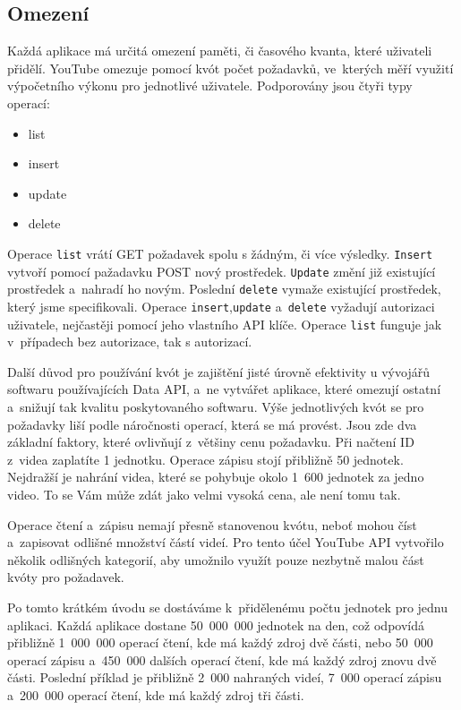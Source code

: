 \subsection{Omezení}
\par Každá aplikace má určitá omezení\cite{googleconsole} paměti\cite{quota}, či časového kvanta, které uživateli přidělí. YouTube omezuje pomocí kvót počet požadavků, ve~kterých měří využití výpočetního výkonu pro jednotlivé uživatele. Podporovány jsou čtyři typy operací:
\begin{itemize}
\item {list}
\item {insert}
\item {update}
\item {delete}
\end{itemize}
\par Operace \texttt{list} vrátí GET požadavek spolu s žádným, či více výsledky. \texttt{Insert} vytvoří pomocí pažadavku POST nový prostředek. \texttt{Update} změní již existující prostředek a~nahradí ho novým. Poslední \texttt{delete} vymaže existující prostředek, který jsme specifikovali. Operace \texttt{insert},\texttt{update} a~\texttt{delete} vyžadují autorizaci uživatele, nejčastěji pomocí jeho vlastního API\cite{apistart} klíče. Operace \texttt{list} funguje jak v~případech bez autorizace, tak s autorizací.
\par Další důvod pro používání kvót je zajištění jisté úrovně efektivity u vývojářů softwaru používajících Data API, a~ne vytvářet aplikace, které omezují ostatní a~snižují tak kvalitu poskytovaného softwaru. Výše jednotlivých kvót se pro požadavky liší podle náročnosti operací, která se má provést. Jsou zde dva základní faktory, které ovlivňují z~většiny cenu požadavku. Při načtení ID z~videa zaplatíte 1 jednotku. Operace zápisu stojí přibližně 50 jednotek. Nejdražší je nahrání videa, které se pohybuje okolo 1~600 jednotek za jedno video. To se Vám může zdát jako velmi vysoká cena, ale není tomu tak. 
\par Operace čtení a~zápisu nemají přesně stanovenou kvótu, neboť mohou číst a~zapisovat odlišné množství částí videí. Pro tento účel YouTube API vytvořilo několik odlišných kategorií, aby umožnilo využít pouze nezbytně malou část kvóty pro požadavek. 
\par Po tomto krátkém úvodu se dostáváme k~přidělenému počtu jednotek pro jednu aplikaci. Každá aplikace dostane 50~000~000 jednotek na den, což odpovídá přibližně 1~000~000 operací čtení, kde má každý zdroj dvě části, nebo 50~000 operací zápisu a~450~000 dalších operací čtení, kde má každý zdroj znovu dvě části. Poslední příklad je přibližně 2~000 nahraných videí, 7~000 operací zápisu a~200~000 operací čtení, kde má každý zdroj tři části.
